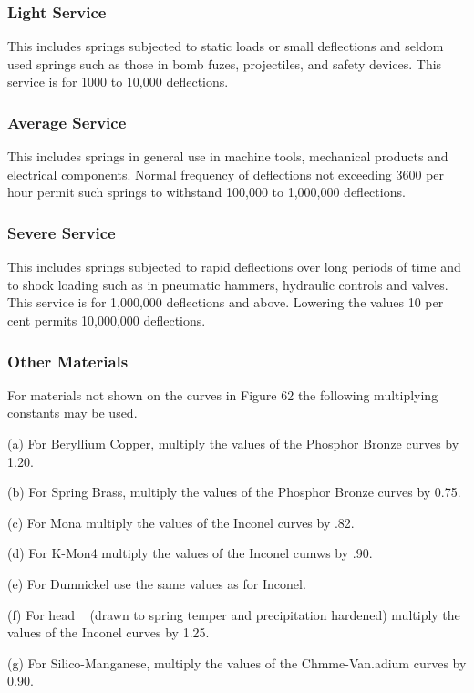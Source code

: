\documentclass[10pt]{article}
\begin{document}
\subsubsection{Light Service} %
This includes springs subjected to static loads or small deflections and seldom used springs such as those in bomb fuzes, projectiles, and safety devices.
This service is for 1000 to 10,000 deflections.

\subsubsection{Average Service} %
This includes springs in general use in machine tools, mechanical products and electrical components.
Normal frequency of deflections not exceeding 3600 per hour permit such springs to withstand 100,000 to 1,000,000 deflections.

\subsubsection{Severe Service} %
This includes springs subjected to rapid deflections over long periods of time and to shock loading such as in pneumatic hammers, hydraulic controls and valves.
This service is for 1,000,000 deflections and above.
Lowering the values 10 per cent permits 10,000,000 deflections. 

\subsubsection{Other Materials} %
For materials not shown on the curves in Figure 62 the following multiplying constants may be used.

(a) For Beryllium Copper, multiply the values of the Phosphor Bronze curves by 1.20.

(b) For Spring Brass, multiply the values of the Phosphor Bronze curves by 0.75.

(c) For Mona multiply the values of the Inconel curves by .82.

(d) For K-Mon4 multiply the values of the Inconel cumws by .90.

(e) For Dumnickel use the same values as for Inconel.

(f) For head ~ (drawn to spring temper and precipitation hardened) multiply the values of the Inconel curves by 1.25.

(g) For Silico-Manganese, multiply the values of the Chmme-Van.adium curves by 0.90.
\end{document}
